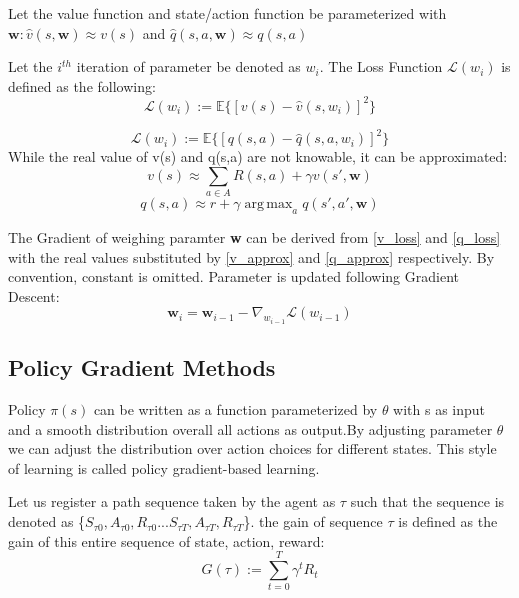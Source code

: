 \documentclass[journal]{IEEEtran}
\DeclareMathOperator*{\argmax}{arg\,max}  %
\begin{document}
Let the value function and state/action function be parameterized with $\textbf{w}:  \hat{v}(s,\textbf{w}) \approx v(s)$ and $\hat{q}(s,a,\textbf{w}) \approx q(s,a) $

Let the $i^{th}$ iteration of parameter be denoted as $\textbf{$w_i$}$. The Loss Function $\mathcal{L}(\textbf{$w_i$})$ is defined as the following:
\begin{equation}
    \mathcal{L}(\textbf{$w_i$}) := \mathbb{E}\{[v(s)-\hat{v}(s,\textbf{$w_i$})]^2\}
    \label{v_loss}
\end{equation}

\begin{equation}
    \mathcal{L}(\textbf{$w_i$}) := \mathbb{E}\{[q(s,a)-\hat{q}(s,a,\textbf{$w_i$})]^2\}
    \label{q_loss}
\end{equation}
While the real value of v(s) and q(s,a) are not knowable, it can be approximated:
\begin{equation}
    v(s) \approx \sum_{a \in A} R(s,a)+\gamma v(s',\textbf{w})
    \label{v_approx}
\end{equation}
\begin{equation}
    q(s,a) \approx r+\gamma \argmax_{a} q(s',a',\textbf{w})
    \label{q_approx}
\end{equation}

The Gradient of weighing paramter \textbf{w} can be derived from \ref{v_loss} and \ref{q_loss} with the real values substituted by \ref{v_approx} and \ref{q_approx} respectively. By convention, constant is omitted. Parameter is updated following Gradient Descent:
\begin{equation}
\textbf{w}_{i}=\textbf{w}_{i-1}-\nabla_{w_{i-1}} \mathcal{L}(w_{i-1})
\end{equation}
\subsection{Policy Gradient Methods}
Policy $\pi(s)$ can be written as a function parameterized by $\theta$ with s as input and a smooth distribution overall all actions as output.By adjusting parameter $\theta$ we can adjust the distribution over action choices for different states. This style of learning is called policy gradient-based learning.

Let us register a path sequence taken by the agent as $\tau$ such that the sequence is denoted as \{$S_{\tau 0},A_{\tau 0}, R_{\tau 0}...S_{\tau T},A_{\tau T},R_{\tau T}$\}. the gain of sequence $\tau$ is defined as the gain of this entire sequence of state, action, reward:
\begin{equation}
    G(\tau):=\displaystyle\sum_{t=0}^{T}\gamma^t R_t
\end{equation}
\end{document}
